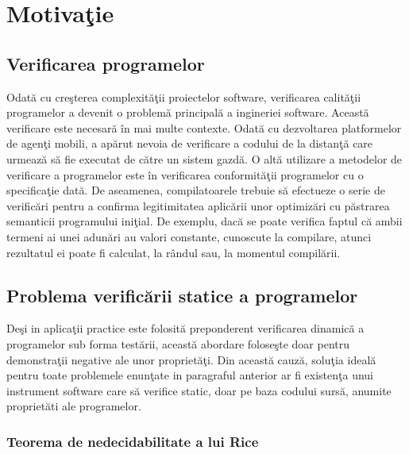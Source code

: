 
\chapter{Motiva\c tie} %
\label{Capitolul1}

\section{Verificarea programelor}

Odat\u a cu cre\c sterea complexit\u a\c tii proiectelor software, verificarea calit\u a\c tii programelor a devenit o problem\u a principal\u a a ingineriei software. Aceast\u a verificare este necesar\u a \^ in mai multe contexte. Odat\u a cu dezvoltarea platformelor de agen\c ti mobili, a ap\u arut nevoia de verificare a codului de la distan\c t\u a care urmeaz\u a s\u a fie executat de c\u atre un sistem gazd\u a. O alt\u a utilizare a metodelor de verificare a programelor este \^ in verificarea conformit\u a\c tii programelor cu o specifica\c tie dat\u a. De aseamenea, compilatoarele trebuie s\u a efectueze o serie de verific\u ari pentru a confirma legitimitatea aplic\u arii unor optimiz\u ari cu p\u astrarea semanticii programului ini\c tial. De exemplu, dac\u a se poate verifica faptul c\u a ambii termeni ai unei adun\u ari au valori constante, cunoscute la compilare, atunci rezultatul ei poate fi calculat, la r\^ andul sau, la momentul compil\u arii.

\section[Problema verific\u arii statice]{Problema verific\u arii statice a programelor}

De\c si in aplica\c tii practice este folosit\u a preponderent verificarea dinamic\u a a programelor sub forma test\u arii, aceast\u a abordare folose\c ste doar pentru demonstra\c tii negative ale unor propriet\u a\c ti. Din aceast\u a cauz\u a, solu\c tia ideal\u a pentru toate problemele enun\c tate in paragraful anterior ar fi existen\c ta unui instrument software care s\u a verifice static, doar pe baza codului surs\u a, anumite propriet\u ati ale programelor.

\subsection[Teorema lui Rice]{Teorema de nedecidabilitate a lui Rice}

